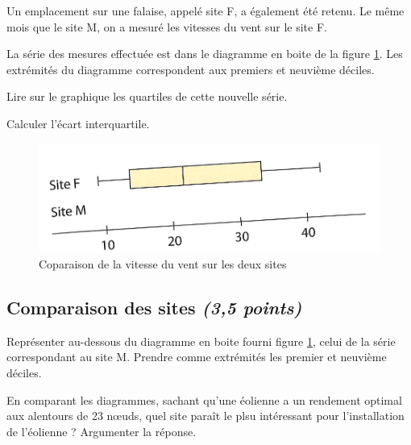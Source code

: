 Un emplacement sur une falaise, appelé site F, a également été retenu. Le même mois que le site M, on a mesuré les vitesses du vent sur le site F.

La série des mesures effectuée est dans le diagramme en boite de la figure \ref{fig:comparaison}. Les extrémités du diagramme correspondent aux premiers et neuvième déciles.

\begin{questions}
	
	\question[1] Lire sur le graphique les quartiles de cette nouvelle série.
	
	\question[1] Calculer l'écart interquartile.
\end{questions}

\begin{figure}[h]
	\begin{center}
		\includegraphics[scale=1.2]{moustache}
	\end{center}
	\caption{Coparaison de la vitesse du vent sur les deux sites}
	\label{fig:comparaison}
\end{figure}

\subsection{Comparaison des sites \textit{(3,5 points)}}\label{part:comp}

\begin{questions}
	\question[1\half] Représenter au-dessous du diagramme en boite fourni figure \ref{fig:comparaison}, celui de la série correspondant au site M. Prendre comme extrémités les premier et neuvième déciles.
	
	\question[2] En comparant les diagrammes, sachant qu'une éolienne a un rendement optimal aux alentours de 23 n\oe uds, quel site paraît le plsu intéressant pour l'installation de l'éolienne ? Argumenter la réponse. 
\end{questions}